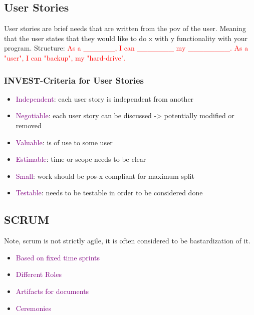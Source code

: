 \documentclass[main.tex,fontsize=12pt,paper=a4,paper=landscape,DIV=calc,]{scrartcl}
\begin{document}
\begin{multicols*}{2}
\subsection{User Stories}
User stories are brief needs that are written from the pov of the user.\newline
Meaning that the user states that they would like to do x with y functionality with your program.\newline
Structure:\newline
\textcolor{red}{As a \_\_\_\_\_\_, I can \_\_\_\_\_\_\_ my \_\_\_\_\_\_\_\_. \newline
As a "user", I can "backup", my "hard-drive".}

\subsubsection{INVEST-Criteria for User Stories}
\begin{itemize}
\item \textcolor{purple}{Independent}: each user story is independent from another
\item \textcolor{purple}{Negotiable}: each user story can be discussed -> potentially modified or removed
\item \textcolor{purple}{Valuable}: is of use to some user
\item \textcolor{purple}{Estimable}: time or scope needs to be clear
\item \textcolor{purple}{Small}: work should be pos-x compliant for maximum split
\item \textcolor{purple}{Testable}: needs to be testable in order to be considered done
\end{itemize} 

\subsection{SCRUM}
Note, scrum is not strictly agile, it is often considered to be bastardization of it.\newline
\begin{itemize}
\item \textcolor{purple}{Based on fixed time sprints}
\item \textcolor{purple}{Different Roles}
\item \textcolor{purple}{Artifacts for documents}
\item \textcolor{purple}{Ceremonies}
\end{itemize} 


\end{multicols*}
\end{document}
